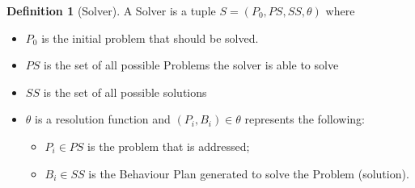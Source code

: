 \documentclass[journal]{IEEEtran}
\theoremstyle{definition}
\newtheorem{definition}{Definition}
\begin{document}
\begin{definition}[Solver]
A Solver is a tuple $S=(P_0, PS, SS, \theta)$ where
\begin{itemize}
\item $P_0$ is the initial problem that should be solved.
\item $PS$ is the set of all possible Problems the solver is able to solve
\item $SS$ is the set of all possible solutions
\item $\theta$ is a resolution function and $(P_i, B_i) \in \theta$ represents the following:
\begin{itemize}
\item $P_i \in PS$ is the problem that is addressed;
\item $B_i \in SS$ is the  Behaviour Plan generated to solve the Problem (solution).
\end{itemize}
\end{itemize}
\end{definition}
\end{document}
